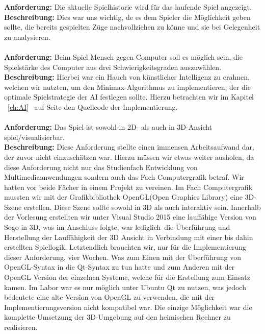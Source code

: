 \documentclass[a4paper]{scrartcl}
\begin{document}
\textbf{Anforderung:} 
Die aktuelle Spielhistorie wird für das laufende Spiel angezeigt.
\\ 
\textbf{Beschreibung:} Dies war uns wichtig, de es dem Spieler die Möglichkeit geben sollte, die bereits gespielten Züge nachvollziehen zu könne und sie bei Gelegenheit zu analysieren.
\\
\\
\textbf{Anforderung:} 
Beim Spiel Mensch gegen Computer soll es möglich sein, die Spielstärke des Computer aus drei Schwierigkeitsgraden auszuwählen.
\\
\textbf{Beschreibung:} Hierbei war ein Hauch von künstlicher Intelligenz zu erahnen, welchen wir nutzten, um den Minimax-Algorithmus zu implementieren, der die optimale Spielstrategie der AI festlegen sollte. Hierzu betrachten wir im Kapitel ~\ref{ch:AI} \glqq{}\grqq \ auf Seite \pageref{ch:AI} den Quellcode der Implementierung.
\\
\\
\textbf{Anforderung:} 
Das Spiel ist sowohl in 2D- als auch in 3D-Ansicht spiel/visualisierbar.
\\
\textbf{Beschreibung:} Diese Anforderung stellte einen immensen Arbeitsaufwand dar, der zuvor nicht einzuschätzen war. Hierzu müssen wir etwas weiter ausholen, da diese Anforderung nicht nur das Studienfach Entwicklung von Multimediaanwendungen sondern auch das Fach Computergrafik betraf. Wir hatten vor beide Fächer in einem Projekt zu vereinen. Im Fach Computergrafik mussten wir mit der Grafikbibliothek OpenGL(Open Graphics Library) eine 3D-Szene erstellen. Diese Szene sollte sowohl in 3D als auch interaktiv sein. Innerhalb der Vorlesung erstellten wir unter Visual Studio 2015 eine lauffähige Version von Sogo in 3D, was im Anschluss folgte, war \glqq lediglich\grqq \ die Überführung und Herstellung der Lauffähigkeit der 3D Ansicht in Verbindung mit einer bis dahin erstellten Spiellogik. Letztendlich brauchten wir, nur für die  Implementierung dieser Anforderung, vier Wochen. Was zum Einen mit der Überführung von OpenGL-Syntax in die Qt-Syntax zu tun hatte und zum Anderen mit der OpenGL Version der einzelnen Systeme, welche für die Erstellung zum Einsatz kamen. Im Labor war es nur möglich unter Ubuntu Qt zu nutzen, was jedoch bedeutete eine alte Version von OpenGL zu verwenden, die mit der Implementierungsversion nicht kompatibel war. Die einzige Möglichkeit war die komplette Umsetzung der 3D-Umgebung auf den heimischen Rechner zu realisieren.
\\ 
\\
\end{document}
